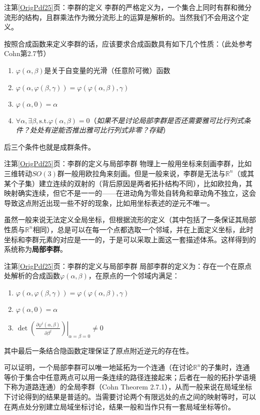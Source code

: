 \documentclass{beamer}
\newcommand{\refpage}[1]{第\ref{OrigPdf#1}页}%
\newcommand{\pp}[2]{\frac{\partial #1}{\partial #2}}
\newcommand{\ppat}[3]{\left.\left(\pp{#1}{#2}\right)\right|_{#3}}
\begin{document}
\begin{frame}{注\refpage{25}：李群的定义}
	李群的严格定义为，一个集合上同时有群和微分流形的结构，且群乘法作为微分流形上的运算是解析的。当然我们不会用这个定义。
	
	按照合成函数来定义李群的话，应该要求合成函数具有如下几个性质：（此处参考Cohn第2.7节）
	\begin{enumerate}
		\item $\varphi(\alpha,\beta)$是关于自变量的光滑（任意阶可微）函数
		\item $\varphi(\alpha,\varphi(\beta,\gamma))=\varphi(\varphi(\alpha,\beta),\gamma)$
		\item $\varphi(\alpha,0)=\alpha$
		\item $\forall \alpha,\exists\beta, \text{s.t.}\varphi(\alpha,\beta)=0$（\textit{如果不是讨论局部李群是否还需要雅可比行列式条件？处处有逆能否推出雅可比行列式非零？存疑}）
	\end{enumerate}
	后三个条件也就是成群条件。
\end{frame}

\begin{frame}{注\refpage{25}：李群的定义与局部李群}
	物理上一般用坐标来刻画李群，比如三维转动$SO(3)$群一般用欧拉角来刻画。但是一般来说，李群是无法与$\mathbb R^n$（或其某个子集）建立连续的双射的（背后原因是两者拓扑结构不同），比如欧拉角，其映射确实连续，但它不是一一的——在进动角为零处自转角和章动角不独立，这会导致这点附近出现一些不好的现象，比如用坐标表述的逆元不唯一。
	
	虽然一般来说无法定义全局坐标，但根据流形的定义（其中包括了一条保证其局部性质与$\mathbb R^n$相同），总是可以在每一个点都选取一个邻域，并在上面定义坐标，此时坐标和李群元素的对应是一一的，于是可以采取上面这一套描述体系。这样得到的系统称为\textbf{局部李群}。
\end{frame}

\begin{frame}{注\refpage{25}：李群的定义与局部李群}
	局部李群的定义为：存在一个在原点处解析的合成函数$\varphi(\alpha,\beta)$，在原点的一个邻域内满足：
	\begin{enumerate}
		\item $\varphi(\alpha,\varphi(\beta,\gamma))=\varphi(\varphi(\alpha,\beta),\gamma)$
		\item $\varphi(\alpha,0)=\alpha$
		\item $\det\ppat{\varphi^i(\alpha,\beta)}{\beta^j}{\alpha=\beta=0}\neq 0$
	\end{enumerate}
	其中最后一条结合隐函数定理保证了原点附近逆元的存在性。
	
	可以证明，一个局部李群可以唯一地延拓为一个连通（在讨论$\mathbb R^n$的子集时，连通等价于集合中任意两点可以用一条连续的路径连接起来；后者在一般的拓扑学语境下称为道路连通）的全局李群（Cohn Theorem 2.7.1），从而一般来说在局域坐标下讨论得到的结果是普适的。当需要讨论两个有限远处的点之间的映射等时，可以在两点处分别建立局域坐标讨论，结果一般和当作只有一套局域坐标等价。
\end{frame}
\end{document}

